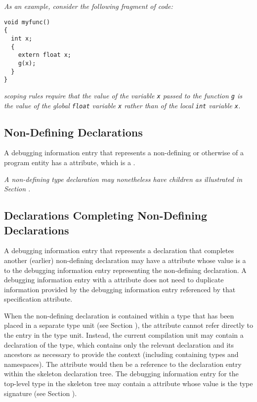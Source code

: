 \textit{As an example, consider the following fragment of  code:}

\begin{lstlisting}
void myfunc()
{
  int x;
  {
    extern float x;
    g(x);
  }
}
\end{lstlisting}


\textit{ scoping rules require that the 
value of the variable \texttt{x} passed to the function 
\texttt{g} is the value of the global \texttt{float} 
variable \texttt{x} rather than of the local \texttt{int} 
variable \texttt{x}.}

\subsection{Non-Defining Declarations}
A debugging information entry that 
represents a non-defining 
or otherwise 
of a program entity has a
\DWATdeclarationDEFN{} attribute, which is a 
.

\textit{A non-defining type declaration may nonetheless have 
children as illustrated in Section
.}


\subsection{Declarations Completing Non-Defining Declarations}
\hypertarget{chap:DWATspecificationincompletenondefiningorseparatedeclaration}{}
A debugging information entry that represents a declaration
that completes another (earlier) non-defining declaration may have a 
\DWATspecificationDEFN{}
attribute whose value is a  to
the debugging information entry representing the non-defining declaration. 
A debugging information entry with a 
\DWATspecificationNAME{} 
attribute does not need to duplicate information provided by the 
debugging information entry referenced by that specification attribute.

When the non-defining declaration is contained within a type that has
been placed in a separate type unit (see Section ), 
the \DWATspecification{} attribute cannot refer directly to the entry in
the type unit. Instead, the current compilation unit may contain a
 declaration of the type, which contains only the relevant
declaration and its ancestors as necessary to provide the context
(including containing types and namespaces). The \DWATspecification{}
attribute would then be a reference to the declaration entry within
the skeleton declaration tree. The debugging information entry for the
top-level type in the skeleton tree may contain a \DWATsignature{}
attribute whose value is the type signature 
(see Section ).

